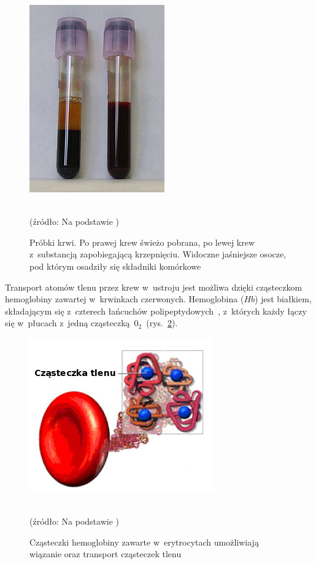 \begin{figure}[!ht]
	\centerline{\includegraphics[scale = 0.64]{graphic/osocze.jpg}}
	\caption{Próbki krwi. Po prawej krew świeżo pobrana, po lewej krew z~substancją zapobiegającą krzepnięciu. Widoczne jaśniejsze osocze, pod 
		 którym osadziły się składniki komórkowe}
	~\\
	(źródło: Na podstawie \cite{Dwyer:2008})
	\label{rys:osocze}
\end{figure}
\noindent Transport atomów tlenu przez krew w~ustroju jest możliwa dzięki cząsteczkom hemoglobiny zawartej w~krwinkach czerwonych. 
Hemoglobina ($Hb$) jest białkiem, składającym się z~czterech łańcuchów polipeptydowych~\cite{Fizj:2007}, z~których każdy łączy się w~płucach 
z~jedną cząsteczką~$0_{2}$~(rys.~\ref{rys:hemoglobina}). 
\begin{figure}[!ht]
\centerline{\includegraphics[scale = 0.66]{graphic/hemoglobina.jpg}}
	\caption{Cząsteczki hemoglobiny zawarte w~erytrocytach umożliwiają wiązanie oraz transport cząsteczek tlenu}
	\label{rys:hemoglobina}
	~\\
	(źródło: Na podstawie \cite{Dwyer:2008})
\end{figure}

